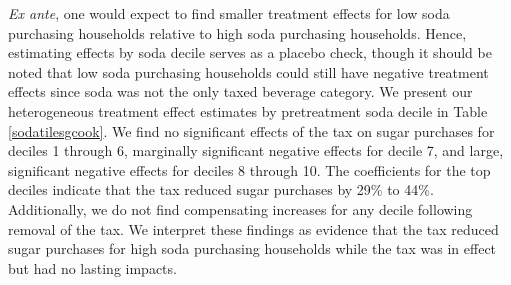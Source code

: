 \documentclass[12pt]{article}
\begin{document}
\textit{Ex ante}, one would expect to find smaller treatment effects for low soda purchasing households relative to high soda purchasing households. Hence, estimating effects by soda decile serves as a placebo check, though it should be noted that low soda purchasing households could still have negative treatment effects since soda was not the only taxed beverage category. We present our heterogeneous treatment effect estimates by pretreatment soda decile in Table \ref{sodatilesgcook}. We find no significant effects of the tax on sugar purchases for deciles 1 through 6, marginally significant negative effects for decile 7, and large, significant negative effects for deciles 8 through 10. The coefficients for the top deciles indicate that the tax reduced sugar purchases by 29\% to 44\%. Additionally, we do not find compensating increases for any decile following removal of the tax. We interpret these findings as evidence that the tax reduced sugar purchases for high soda purchasing households while the tax was in effect but had no lasting impacts.


%
\end{document}
